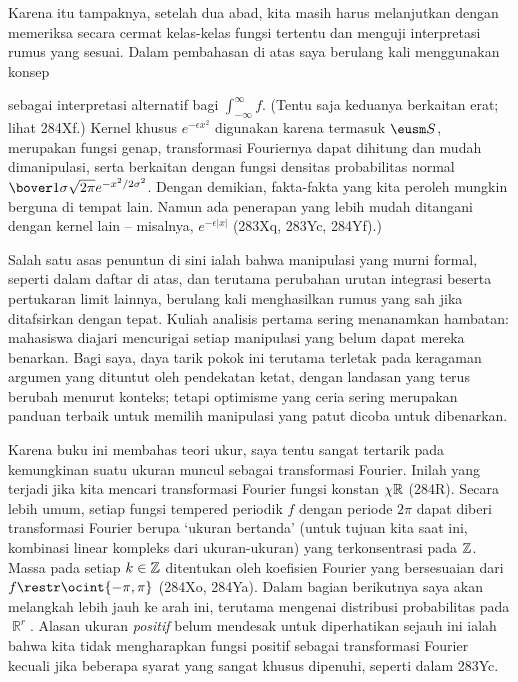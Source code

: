 {Karena itu tampaknya, setelah dua abad, %
 kita masih harus melanjutkan dengan memeriksa secara cermat kelas-kelas fungsi
tertentu dan menguji interpretasi rumus yang sesuai. Dalam pembahasan di atas
saya berulang kali menggunakan konsep


\noindent sebagai interpretasi alternatif bagi $\int_{-\infty}^{\infty}f$.
(Tentu saja keduanya berkaitan erat; lihat 284Xf.) Kernel khusus
$e^{-\epsilon x^2}$ digunakan karena termasuk $\eusm S$, merupakan fungsi
genap, transformasi Fouriernya dapat dihitung dan mudah dimanipulasi, serta
berkaitan dengan fungsi densitas probabilitas normal
$\bover1{\sigma\sqrt{2\pi}}e^{-x^2/2\sigma^2}$. Dengan demikian, fakta-fakta
yang kita peroleh mungkin berguna di tempat lain. Namun ada penerapan yang
lebih mudah ditangani dengan kernel lain -- misalnya,
$e^{-\epsilon|x|}$ (283Xq, 283Yc, 284Yf).)

Salah satu asas penuntun di sini ialah bahwa manipulasi yang murni formal,
seperti dalam daftar di atas, dan terutama perubahan urutan integrasi beserta
pertukaran limit lainnya, berulang kali menghasilkan rumus yang sah jika
ditafsirkan dengan tepat. Kuliah analisis pertama sering menanamkan hambatan:
mahasiswa diajari mencurigai setiap manipulasi yang belum dapat mereka
benarkan. Bagi saya, daya tarik pokok ini terutama terletak pada keragaman
argumen yang dituntut oleh pendekatan ketat, dengan landasan yang terus berubah
menurut konteks; tetapi optimisme yang ceria sering merupakan panduan terbaik
untuk memilih manipulasi yang patut dicoba untuk dibenarkan.

Karena buku ini membahas teori ukur, saya tentu sangat tertarik pada kemungkinan
suatu ukuran muncul sebagai transformasi Fourier. Inilah yang terjadi jika kita
mencari transformasi Fourier fungsi konstan $\chi\Bbb R$ (284R). Secara lebih
umum, setiap fungsi tempered periodik $f$ dengan periode $2\pi$ dapat diberi
transformasi Fourier berupa `ukuran bertanda' (untuk tujuan kita saat ini,
kombinasi linear kompleks dari ukuran-ukuran) yang terkonsentrasi pada
$\Bbb Z$. Massa pada setiap $k\in\Bbb Z$ ditentukan oleh koefisien Fourier yang
bersesuaian dari $f\restr\ocint{-\pi,\pi}$ (284Xo, 284Ya). Dalam bagian
berikutnya saya akan melangkah lebih jauh ke arah ini, terutama mengenai
distribusi probabilitas pada $\BbbR^r$. Alasan ukuran {\it positif} belum
mendesak untuk diperhatikan sejauh ini ialah bahwa kita tidak mengharapkan
fungsi positif sebagai transformasi Fourier kecuali jika beberapa syarat yang
sangat khusus dipenuhi, seperti dalam 283Yc.

}
